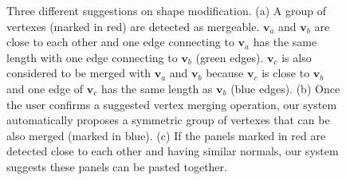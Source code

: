 \begin{figure}
	\centering
	\hfill
	\hfill
	
	\caption{Three different suggestions on shape modification. (a) A group of vertexes (marked in red) are detected as mergeable. $\mathbf{v}_a$ and $\mathbf{v}_b$ are close to each other and one edge connecting to $\mathbf{v}_a$ has the same length with one edge connecting to $\mathbf{v}_b$ (green edges). $\mathbf{v}_c$ is also considered to be merged with $\mathbf{v}_a$ and $\mathbf{v}_b$ because $\mathbf{v}_c$ is close to $\mathbf{v}_b$ and one edge of $\mathbf{v}_c$ has the same length as $\mathbf{v}_b$ (blue edges). (b) Once the user confirms a suggested vertex merging operation, our system automatically proposes a symmetric group of vertexes that can be also merged (marked in blue). (c) If the panels marked in red are detected close to each other and having similar normals, our system suggests these panels can be pasted together.}
	\label{fig:suggestion}
\end{figure}



%

